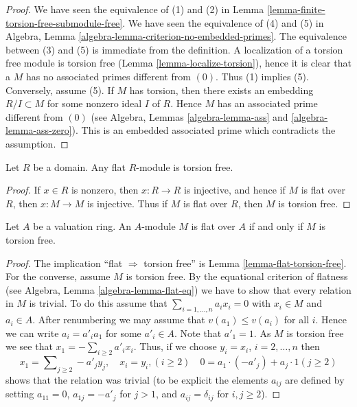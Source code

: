 \begin{proof}
We have seen the equivalence of (1) and (2) in
Lemma \ref{lemma-finite-torsion-free-submodule-free}.
We have seen the equivalence of (4) and (5) in
Algebra, Lemma \ref{algebra-lemma-criterion-no-embedded-primes}.
The equivalence between (3) and (5) is immediate from the definition.
A localization of a torsion free module is torsion free
(Lemma \ref{lemma-localize-torsion}), hence it is clear that a
$M$ has no associated primes different from $(0)$. Thus (1)
implies (5). Conversely, assume (5). If $M$ has torsion,
then there exists an embedding $R/I \subset M$ for some nonzero
ideal $I$ of $R$. Hence $M$ has an associated prime different
from $(0)$
(see Algebra, Lemmas \ref{algebra-lemma-ass} and \ref{algebra-lemma-ass-zero}).
This is an embedded associated prime which contradicts the assumption.
\end{proof}

\begin{lemma}
\label{lemma-flat-torsion-free}
Let $R$ be a domain. Any flat $R$-module is torsion free.
\end{lemma}

\begin{proof}
If $x \in R$ is nonzero, then $x : R \to R$ is injective, and hence if $M$
is flat over $R$, then $x : M \to M$ is injective. Thus if $M$ is flat over
$R$, then $M$ is torsion free.
\end{proof}

\begin{lemma}
\label{lemma-valuation-ring-torsion-free-flat}
Let $A$ be a valuation ring.
An $A$-module $M$ is flat over $A$ if and only if $M$ is torsion free.
\end{lemma}

\begin{proof}
The implication ``flat $\Rightarrow$ torsion free'' is
Lemma \ref{lemma-flat-torsion-free}.
For the converse, assume $M$ is torsion free.
By the equational criterion of flatness (see
Algebra, Lemma \ref{algebra-lemma-flat-eq})
we have to show that every relation in $M$ is trivial. To do this assume that
$\sum_{i = 1, \ldots, n} a_i x_i = 0$ with $x_i \in M$ and $a_i \in A$.
After renumbering we may assume that $v(a_1) \leq v(a_i)$ for all $i$.
Hence we can write $a_i = a'_i a_1$ for some $a'_i \in A$. Note that
$a'_1 = 1$. As $M$ is torsion free we see that
$x_1 = - \sum_{i \geq 2} a'_i x_i$. Thus, if we choose
$y_i = x_i$, $i = 2, \ldots, n$ then
$$
x_1 = \sum\nolimits_{j \geq 2} -a'_j y_j, \quad
x_i = y_i, (i \geq 2)\quad
0 = a_1 \cdot (-a'_j) + a_j \cdot 1 (j \geq 2)
$$
shows that the relation was trivial (to be explicit the elements
$a_{ij}$ are defined by setting $a_{11} = 0$, $a_{1j} = -a'_j$
for $j > 1$, and $a_{ij} = \delta_{ij}$ for $i, j \geq 2$).
\end{proof}

